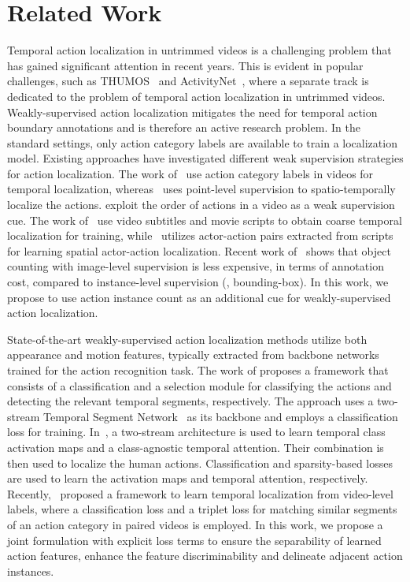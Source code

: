 \documentclass[10pt,twocolumn,letterpaper]{article}
\begin{document}
\section{Related Work}
Temporal action localization in untrimmed videos is a challenging problem that has gained significant attention in recent years. This is evident in popular challenges, such as THUMOS~\cite{thumos14} and ActivityNet~\cite{activitynet}, where a separate track is dedicated to the problem of temporal action localization in untrimmed videos. Weakly-supervised action localization mitigates the need for temporal action boundary annotations and is therefore an active research problem. In the standard settings, only action category labels are available to train a localization model. 
Existing approaches have investigated different weak supervision strategies for action localization. The work of~\cite{hideseek,stpn,untrimnets} use action category labels in videos for temporal localization, whereas~\cite{point-supervision} uses point-level supervision to spatio-temporally localize the actions. \cite{order-constraints-kuehne,order-constraints-bojan} exploit the order of actions in a video as a weak supervision cue. The work of~\cite{TAL-movie-scripts,auto-annotation}
use video subtitles and movie scripts to obtain coarse temporal localization for training, while~\cite{actor-action} utilizes actor-action pairs extracted from scripts for learning spatial actor-action localization. Recent work of~\cite{obj-c-wsl} shows that object counting with image-level supervision is less expensive, in terms of annotation cost, compared to instance-level supervision (\eg, bounding-box). In this work, we propose to use action instance count as an additional cue for weakly-supervised action localization.

State-of-the-art weakly-supervised action localization methods utilize both appearance and motion features, typically extracted from backbone networks trained for the action recognition task. The work of \cite{untrimnets} proposes a framework that consists of a classification and a selection module for classifying the actions and detecting the relevant temporal segments, respectively. The approach uses a two-stream Temporal Segment Network~\cite{tsn} as its backbone and employs a classification loss for training. In~\cite{stpn}, a two-stream architecture is used to learn temporal class activation maps and a class-agnostic temporal attention. Their combination is then used to localize the human actions. Classification and sparsity-based losses are used to learn the activation maps and temporal attention, respectively. Recently,~\cite{wtalc} proposed a framework to learn temporal localization from video-level labels, where a classification loss and a triplet loss for matching similar segments of an action category in paired videos is employed. In this work, we propose a joint formulation with explicit loss terms to ensure the separability of learned action features, enhance the feature discriminability and delineate adjacent action instances.
\end{document}
